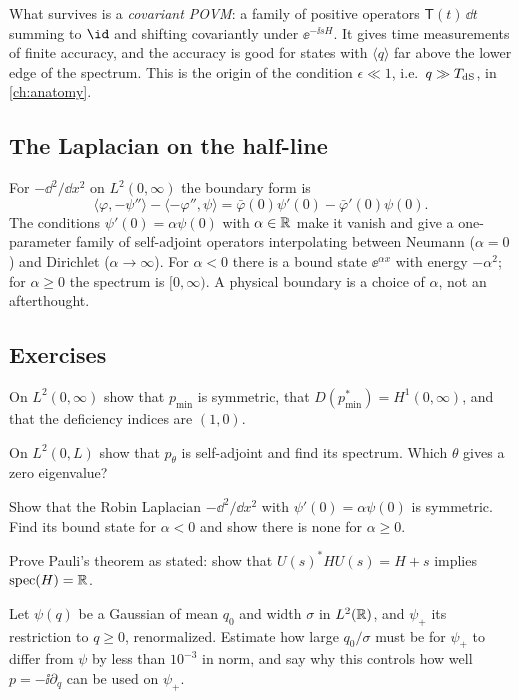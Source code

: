 What survives is a \emph{covariant POVM}: a family of positive operators $\mathsf T(t)\,\dd t$ summing to $\id$ and shifting covariantly under $\ee^{-\ii sH}$. It gives time measurements of finite accuracy, and the accuracy is good for states with $\langle q\rangle$ far above the lower edge of the spectrum. This is the origin of the condition $\epsilon\ll1$, i.e.\ $q\gg T_{\rm dS}$, in \cref{ch:anatomy}.

\subsection{The Laplacian on the half-line}
For $-\dd^2/\dd x^2$ on $L^2(0,\infty)$ the boundary form is
\begin{equation}
\langle\varphi,-\psi''\rangle-\langle-\varphi'',\psi\rangle=\bar\varphi(0)\psi'(0)-\bar\varphi'(0)\psi(0).
\end{equation}
The conditions $\psi'(0)=\alpha\psi(0)$ with $\alpha\in\mathbb{R}$ make it vanish and give a one-parameter family of self-adjoint operators interpolating between Neumann ($\alpha=0$) and Dirichlet ($\alpha\to\infty$). For $\alpha<0$ there is a bound state $\ee^{\alpha x}$ with energy $-\alpha^2$; for $\alpha\ge0$ the spectrum is $[0,\infty)$. A physical boundary is a choice of $\alpha$, not an afterthought.

\subsection*{Exercises}
\begin{exercise}\label{ex:halfline:1}
On $L^2(0,\infty)$ show that $p_{\min}$ is symmetric, that $D(p_{\min}^*)=H^1(0,\infty)$, and that the deficiency indices are $(1,0)$.
\end{exercise}
\begin{exercise}\label{ex:halfline:2}
On $L^2(0,L)$ show that $p_\theta$ is self-adjoint and find its spectrum. Which $\theta$ gives a zero eigenvalue?
\end{exercise}
\begin{exercise}\label{ex:halfline:3}
Show that the Robin Laplacian $-\dd^2/\dd x^2$ with $\psi'(0)=\alpha\psi(0)$ is symmetric. Find its bound state for $\alpha<0$ and show there is none for $\alpha\ge0$.
\end{exercise}
\begin{exercise}\label{ex:halfline:4}
Prove Pauli's theorem as stated: show that $U(s)^*HU(s)=H+s$ implies $\mathrm{spec}(H)=\mathbb{R}$.
\end{exercise}
\begin{exercise}\label{ex:halfline:5}
Let $\psi(q)$ be a Gaussian of mean $q_0$ and width $\sigma$ in $L^2(\mathbb{R})$, and $\psi_+$ its restriction to $q\ge0$, renormalized. Estimate how large $q_0/\sigma$ must be for $\psi_+$ to differ from $\psi$ by less than $10^{-3}$ in norm, and say why this controls how well $p=-\ii\partial_q$ can be used on $\psi_+$.
\end{exercise}
